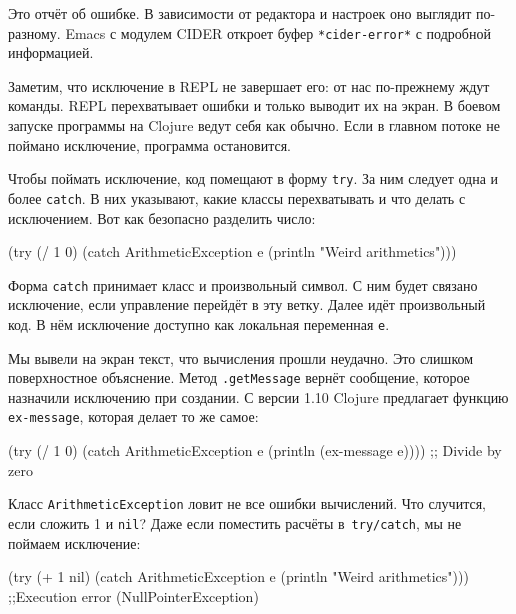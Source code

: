 Это отчёт об ошибке. В зависимости от редактора и настроек оно выглядит
по-разному. Emacs с модулем CIDER откроет буфер \texttt{*cider\--error*}
с подробной информацией.


Заметим, что исключение в REPL не завершает его: от нас по-прежнему ждут
команды. REPL перехватывает ошибки и только выводит их на экран. В боевом
запуске программы на Clojure ведут себя как обычно. Если в главном потоке не
поймано исключение, программа остановится.

Чтобы поймать исключение, код помещают в форму \verb|try|. За ним следует одна
и более \verb|catch|. В них указывают, какие классы перехватывать и что делать
с исключением. Вот как безопасно разделить число:


\begin{english}
  \begin{clojure}
(try
  (/ 1 0)
  (catch ArithmeticException e
    (println "Weird arithmetics")))
  \end{clojure}
\end{english}

Форма \verb|catch| принимает класс и произвольный символ. С ним будет связано
исключение, если управление перейдёт в эту ветку. Далее идёт произвольный код. В
нём исключение доступно как локальная переменная \verb|e|.


Мы вывели на экран текст, что вычисления прошли неудачно. Это слишком
поверхностное объяснение. Метод \verb|.getMessage| вернёт сообщение, которое
назначили исключению при создании. С версии 1.10 Clojure предлагает функцию
\verb|ex-message|, которая делает то же самое:

\begin{english}
  \begin{clojure}
(try
  (/ 1 0)
  (catch ArithmeticException e
    (println (ex-message e))))
;; Divide by zero
  \end{clojure}
\end{english}

Класс \verb|ArithmeticException| ловит не все ошибки вычислений. Что случится,
если сложить 1 и \verb|nil|? Даже если поместить расчёты в~\verb|try/catch|,
мы не поймаем исключение:

\ifx\DEVICETYPE\MOBILE

\begin{english}
  \begin{clojure}
(try
  (+ 1 nil)
  (catch ArithmeticException e
    (println "Weird arithmetics")))
;;Execution error (NullPointerException)
  \end{clojure}
\end{english}

